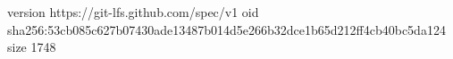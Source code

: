 version https://git-lfs.github.com/spec/v1
oid sha256:53cb085c627b07430ade13487b014d5e266b32dce1b65d212ff4cb40bc5da124
size 1748
